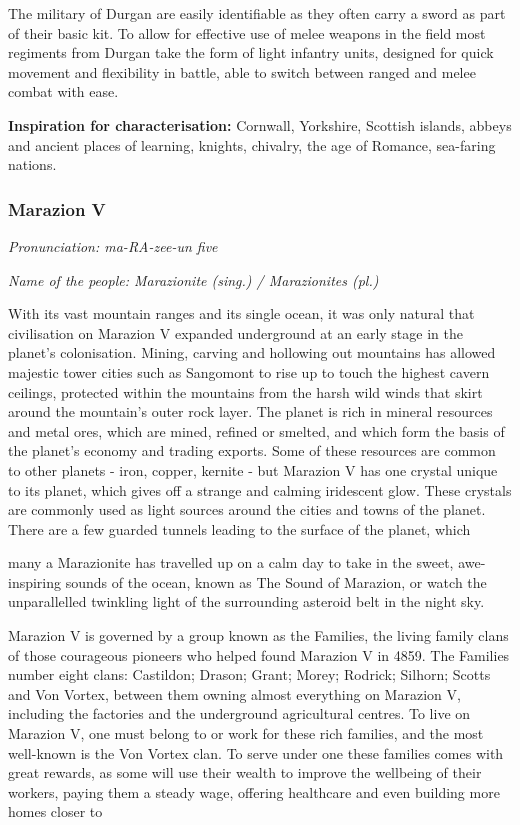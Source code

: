 The military of Durgan are easily identifiable as they often carry a sword as part of their basic kit. To allow for effective use of melee weapons in the field most regiments from Durgan take the form of light infantry units, designed for quick movement and flexibility in battle, able to switch between ranged and melee combat with ease.

\textbf{Inspiration for characterisation:} Cornwall, Yorkshire, Scottish islands, abbeys and ancient places of learning, knights, chivalry, the age of Romance, sea-faring nations.

\subsubsection{Marazion V}

\textit{Pronunciation: ma-RA-zee-un five}

\textit{Name of the people: Marazionite (sing.) / Marazionites (pl.)}

With its vast mountain ranges and its single ocean, it was only natural that civilisation on Marazion V expanded underground at an early stage in the planet's colonisation. Mining, carving and hollowing out mountains has allowed majestic tower cities such as Sangomont to rise up to touch the highest cavern ceilings, protected within the mountains from the harsh wild winds that skirt around the mountain's outer rock layer. The planet is rich in mineral resources and metal ores, which are mined, refined or smelted, and which form the basis of the planet's economy and trading exports. Some of these resources are common to other planets - iron, copper, kernite - but Marazion V has one crystal unique to its planet, which gives off a strange and calming iridescent glow. These crystals are commonly used as light sources around the cities and towns of the planet. There are a few guarded tunnels leading to the surface of the planet, which

many a Marazionite has travelled up on a calm day to take in the sweet, awe-inspiring sounds of the ocean, known as The Sound of Marazion, or watch the unparallelled twinkling light of the surrounding asteroid belt in the night sky.

Marazion V is governed by a group known as the Families, the living family clans of those courageous pioneers who helped found Marazion V in 4859. The Families number eight clans: Castildon; Drason; Grant; Morey; Rodrick; Silhorn; Scotts and Von Vortex, between them owning almost everything on Marazion V, including the factories and the underground agricultural centres. To live on Marazion V, one must belong to or work for these rich families, and the most well-known is the Von Vortex clan. To serve under one these families comes with great rewards, as some will use their wealth to improve the wellbeing of their workers, paying them a steady wage, offering healthcare and even building more homes closer to

